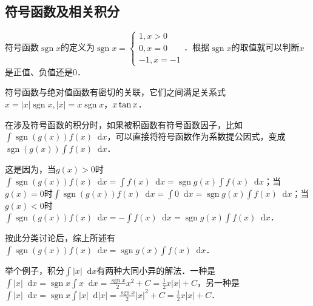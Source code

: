\documentclass{ctexbook}
\DeclareMathOperator{\sgn}{sgn}
\newcommand*{\dif}{\mathop{}\!\mathrm{d}}
\begin{document}
\subsection{符号函数及相关积分}
符号函数$\sgn{x}$的定义为$\sgn{x}=\begin{cases}1,x>0\\0,x=0\\-1,x=-1\end{cases}$．根据$\sgn{x}$的取值就可以判断$x$是正值、负值还是$0$．\par
符号函数与绝对值函数有密切的关联，它们之间满足关系式$x=|x|\sgn{x},|x|=x\sgn{x}$，$\\x\tan{x}$．\par
在涉及符号函数的积分时，如果被积函数有符号函数因子，比如$\int\sgn{\left(g\left(x\right)\right)}f\left(x\right)\dif{x}$，可以直接将符号函数作为系数提公因式，变成$\sgn{\left(g\left(x\right)\right)}\int f\left(x\right)\dif{x}$．\par
这是因为，当$g\left(x\right)>0$时$\int\sgn{\left(g\left(x\right)\right)}f\left(x\right)\dif{x}=\int f\left(x\right)\dif{x}=\sgn{g\left(x\right)}\int f\left(x\right)\dif{x}$；当$g\left(x\right)=0$时$\int\sgn{\left(g\left(x\right)\right)}f\left(x\right)\dif{x}=\int0\dif{x}=\sgn{g\left(x\right)}\int f\left(x\right)\dif{x}$；当$g\left(x\right)<0$时$\int\sgn{\left(g\left(x\right)\right)}f\left(x\right)\dif{x}=-\int f\left(x\right)\dif{x}=\sgn{g\left(x\right)}\int f\left(x\right)\dif{x}$．\par
按此分类讨论后，综上所述有$\int\sgn{\left(g\left(x\right)\right)}f\left(x\right)\dif{x}=\sgn{g\left(x\right)}\int f\left(x\right)\dif{x}$．\par
举个例子，积分$\int|x|\dif{x}$有两种大同小异的解法．一种是$\int|x|\dif{x}=\sgn{x}\int x\dif{x}=\frac{\sgn{x}}{2}x^{2}+C=\frac{1}{2}x|x|+C$，另一种是$\int|x|\dif{x}=\sgn{x}\int|x|\dif{|x|}=\frac{\sgn{x}}{2}|x|^{2}+C=\frac{1}{2}x|x|+C$．\par
\end{document}
